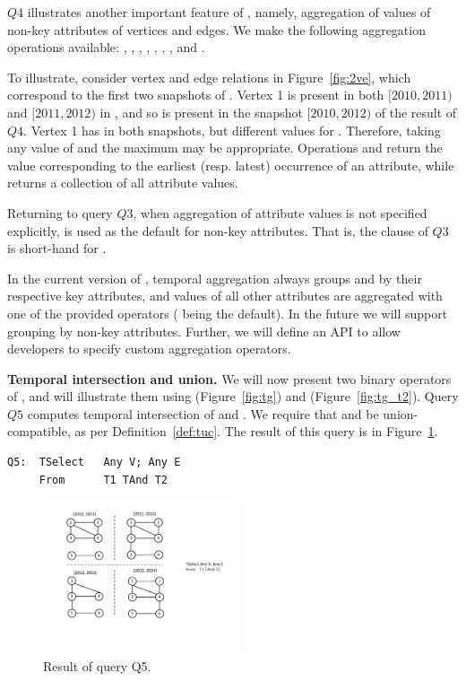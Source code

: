 $Q4$ illustrates another important feature of \ql, namely, aggregation
of values of non-key attributes of vertices and edges.  We make the
following aggregation operations available: ,
, , , , ,
, and .

To illustrate, consider vertex and edge relations in
Figure~\ref{fig:2ve}, which correspond to the first two snapshots of
.  Vertex 1 is present in both $[2010, 2011)$ and $[2011,
    2012)$ in , and so is present in the snapshot $[2010,
      2012)$ of the result of $Q4$.  Vertex 1 has 
      in both snapshots, but different values for .
      Therefore, taking any value of  and the maximum
       may be appropriate.  Operations  and
       return the value corresponding to the earliest
      (resp. latest) occurrence of an attribute, while 
      returns a collection of all attribute values.

Returning to query $Q3$, when aggregation of attribute values is not
specified explicitly,  is used as the default for non-key
attributes.  That is, the  clause of $Q3$ is short-hand
for  
.

In the current version of \ql, temporal aggregation always groups
 and  by their respective key attributes, and values
of all other attributes are aggregated with one of the provided
operators ( being the default).  In the future we will
support grouping by non-key attributes.  Further, we will define an
API to allow developers to specify custom aggregation operators.

{\bf Temporal intersection and union.} We will now present two binary
operators of \ql, and will illustrate them using 
(Figure~\ref{fig:tg}) and  (Figure~\ref{fig:tg_t2}).  Query
$Q5$ computes temporal intersection of  and .  We
require that  and  be union-compatible, as per
Definition~\ref{def:tuc}.  The result of this query is in
Figure~\ref{fig:q5}.

\begin{verbatim}
Q5:  TSelect   Any V; Any E
     From      T1 TAnd T2
\end{verbatim}

\begin{figure}
\centering
\includegraphics[width=2.3in]{figs/q5.pdf}
\caption{Result of query Q5.}
\label{fig:q5}
\end{figure}

